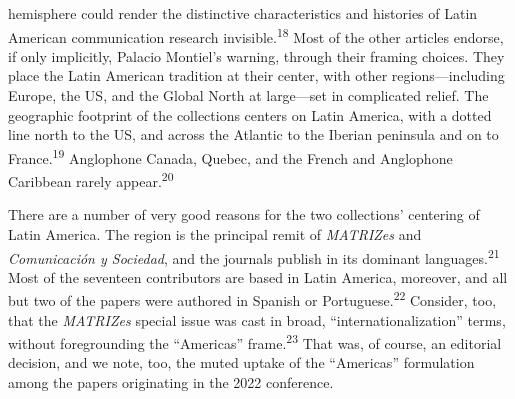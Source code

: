 \documentclass{tufte-handout}
\begin{document}
hemisphere could render the distinctive characteristics and histories of
Latin American communication research invisible.\textsuperscript{18} Most of the other articles endorse, if only
implicitly, Palacio Montiel's warning, through their framing choices.
They place the Latin American tradition at their center, with other
regions---including Europe, the US, and the Global North at large---set
in complicated relief. The geographic footprint of the collections
centers on Latin America, with a dotted line north to the US, and across
the Atlantic to the Iberian peninsula and on to France.\textsuperscript{19}
Anglophone Canada, Quebec, and the French and Anglophone Caribbean
rarely appear.\textsuperscript{20}

There are a number of very good reasons for the two collections'
centering of Latin America. The region is the principal remit of
\emph{MATRIZes} and \emph{Comunicación y Sociedad}, and the journals
publish in its dominant languages.\textsuperscript{21}
Most of the seventeen contributors are based in Latin America, moreover,
and all but two of the papers were authored in Spanish or
Portuguese.\textsuperscript{22} Consider, too, that the \emph{MATRIZes} special issue was
cast in broad, ``internationalization'' terms, without foregrounding the
``Americas'' frame.\textsuperscript{23} That was, of course, an
editorial decision, and we note, too, the muted uptake of the
``Americas'' formulation among the papers originating in the 2022
conference.
\end{document}
